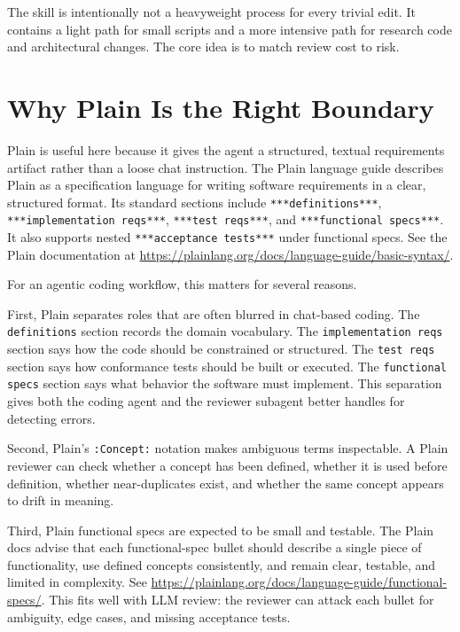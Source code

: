\documentclass[11pt]{article}
\begin{document}
The skill is intentionally not a heavyweight process for every trivial edit. It
contains a light path for small scripts and a more intensive path for research
code and architectural changes. The core idea is to match review cost to risk.

\section{Why Plain Is the Right Boundary}

Plain is useful here because it gives the agent a structured, textual
requirements artifact rather than a loose chat instruction. The Plain language
guide describes Plain as a specification language for writing software
requirements in a clear, structured format. Its standard sections include
\texttt{***definitions***}, \texttt{***implementation reqs***},
\texttt{***test reqs***}, and \texttt{***functional specs***}. It also supports
nested \texttt{***acceptance tests***} under functional specs. See the Plain
documentation at \url{https://plainlang.org/docs/language-guide/basic-syntax/}.

For an agentic coding workflow, this matters for several reasons.

First, Plain separates roles that are often blurred in chat-based coding. The
\texttt{definitions} section records the domain vocabulary. The
\texttt{implementation reqs} section says how the code should be constrained or
structured. The \texttt{test reqs} section says how conformance tests should be
built or executed. The \texttt{functional specs} section says what behavior the
software must implement. This separation gives both the coding agent and the
reviewer subagent better handles for detecting errors.

Second, Plain's \texttt{:Concept:} notation makes ambiguous terms inspectable. A
Plain reviewer can check whether a concept has been defined, whether it is used
before definition, whether near-duplicates exist, and whether the same concept
appears to drift in meaning.

Third, Plain functional specs are expected to be small and testable. The Plain
docs advise that each functional-spec bullet should describe a single piece of
functionality, use defined concepts consistently, and remain clear, testable, and
limited in complexity. See
\url{https://plainlang.org/docs/language-guide/functional-specs/}. This fits well
with LLM review: the reviewer can attack each bullet for ambiguity, edge cases,
and missing acceptance tests.
\end{document}
